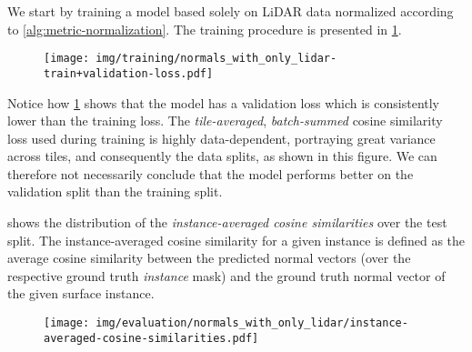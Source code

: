 We start by training a model based solely on LiDAR data normalized according to \cref{alg:metric-normalization}.
The training procedure is presented in \cref{fig:lidar-training}.
%
\begin{figure}[H]
  \texttt{[image: img/training/normals\_with\_only\_lidar-train+validation-loss.pdf]}
  \label{fig:lidar-training}
\end{figure}
\noindent
Notice how \cref{fig:lidar-training} shows that the model has a validation loss which is consistently lower than the training loss.
The \textit{tile-averaged}, \textit{batch-summed} cosine similarity loss used during training is highly data-dependent, portraying great variance across tiles, and consequently the data splits, as shown in this figure.
We can therefore not necessarily conclude that the model performs better on the validation split than the training split.

 shows the distribution of the \textit{instance-averaged cosine similarities} over the test split.
The instance-averaged cosine similarity for a given instance is defined as the average cosine similarity between the predicted normal vectors (over the respective ground truth \emph{instance} mask) and the ground truth normal vector of the given surface instance.

\begin{figure}
  \texttt{[image: img/evaluation/normals\_with\_only\_lidar/instance-averaged-cosine-similarities.pdf]}
  \label{fig:lidar-test-distribution}
\end{figure}

